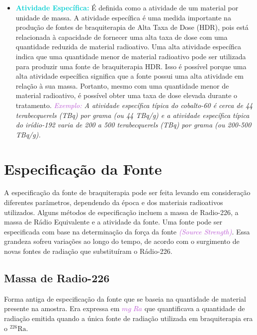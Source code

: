 \documentclass[11pt,a4paper]{article}
\begin{document}
\begin{itemize}
			\item \textcolor{DarkTurquoise}{\textbf{Atividade Específica:}} É definida como a atividade de um material por unidade de massa. A atividade específica é uma medida importante na produção de fontes de braquiterapia de Alta Taxa de Dose (HDR), pois está relacionada à capacidade de fornecer uma alta taxa de dose com uma quantidade reduzida de material radioativo. Uma alta atividade específica indica que uma quantidade menor de material radioativo pode ser utilizada para produzir uma fonte de braquiterapia HDR. Isso é possível porque uma alta atividade específica significa que a fonte possui uma alta atividade em relação à sua massa. Portanto, mesmo com uma quantidade menor de material radioativo, é possível obter uma taxa de dose elevada durante o tratamento. \textit{\textcolor{MediumOrchid}{Exemplo:}  A atividade específica típica do cobalto-60 é cerca de 44 terabecquerels (TBq) por grama (ou 44 TBq/g) e a atividade específica típica do irídio-192 varia de 200 a 500 terabecquerels (TBq) por grama (ou 200-500 TBq/g).}

		\end{itemize}

\section{Especificação da Fonte}
		
	A especificação da fonte de braquiterapia pode ser feita levando em consideração diferentes parâmetros, dependendo da época e dos materiais radioativos utilizados. Alguns métodos de especificação incluem a massa de Radio-226, a massa de Rádio Equivalente e a atividade da fonte.	Uma fonte pode ser especificada com base na determinação da força da fonte \textcolor{MediumOrchid}{\textit{(Source Strength)}}. Essa grandeza sofreu variações ao longo do tempo, de acordo com o surgimento de novas fontes de radiação que substituíram o Rádio-226. 

\subsection*{Massa de Radio-226}

	Forma antiga de especificação da fonte que se baseia na quantidade de material presente na amostra. Era expressa em \textcolor{MediumOrchid}{\textit{$mg\; Ra$}} que quantificava a quantidade de radiação emitida quando a única fonte de radiação utilizada em braquiterapia era o $\mathrm{{}^{226}Ra}$.
\end{document}
